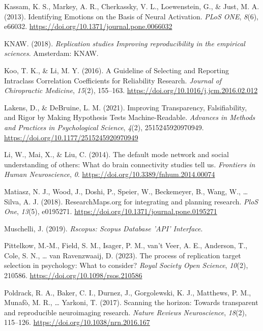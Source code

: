 \documentclass[
  man,floatsintext]{apa6}
\newlength{\cslhangindent}
\newlength{\cslentryspacingunit} %
\newenvironment{CSLReferences}[2] %
 {%
  \setlength{\parindent}{0pt}
  \ifodd #1
  \let\oldpar\par
  \def\par{\hangindent=\cslhangindent\oldpar}
  \fi
  \setlength{\parskip}{#2\cslentryspacingunit}
 }%
 {}
\begin{document}
\begin{CSLReferences}{1}{0}
\leavevmode{}%
Kassam, K. S., Markey, A. R., Cherkassky, V. L., Loewenstein, G., \& Just, M. A. (2013). Identifying {Emotions} on the {Basis} of {Neural Activation}. \emph{PLoS ONE}, \emph{8}(6), e66032. \url{https://doi.org/10.1371/journal.pone.0066032}

\leavevmode{}%
KNAW. (2018). \emph{Replication studies \textendash{} {Improving} reproducibility in the empirical sciences}. {Amsterdam}: {KNAW}.

\leavevmode{}%
Koo, T. K., \& Li, M. Y. (2016). A {Guideline} of {Selecting} and {Reporting Intraclass Correlation Coefficients} for {Reliability Research}. \emph{Journal of Chiropractic Medicine}, \emph{15}(2), 155--163. \url{https://doi.org/10.1016/j.jcm.2016.02.012}

\leavevmode{}%
Lakens, D., \& DeBruine, L. M. (2021). Improving {Transparency}, {Falsifiability}, and {Rigor} by {Making Hypothesis Tests Machine-Readable}. \emph{Advances in Methods and Practices in Psychological Science}, \emph{4}(2), 2515245920970949. \url{https://doi.org/10.1177/2515245920970949}

\leavevmode{}%
Li, W., Mai, X., \& Liu, C. (2014). The default mode network and social understanding of others: What do brain connectivity studies tell us. \emph{Frontiers in Human Neuroscience}, \emph{0}. \url{https://doi.org/10.3389/fnhum.2014.00074}

\leavevmode{}%
Matiasz, N. J., Wood, J., Doshi, P., Speier, W., Beckemeyer, B., Wang, W., \ldots{} Silva, A. J. (2018). {ResearchMaps}.org for integrating and planning research. \emph{PloS One}, \emph{13}(5), e0195271. \url{https://doi.org/10.1371/journal.pone.0195271}

\leavevmode{}%
Muschelli, J. (2019). \emph{Rscopus: {Scopus Database} '{API}' {Interface}}.

\leavevmode{}%
Pittelkow, M.-M., Field, S. M., Isager, P. M., van't Veer, A. E., Anderson, T., Cole, S. N., \ldots{} van Ravenzwaaij, D. (2023). The process of replication target selection in psychology: What to consider? \emph{Royal Society Open Science}, \emph{10}(2), 210586. \url{https://doi.org/10.1098/rsos.210586}

\leavevmode{}%
Poldrack, R. A., Baker, C. I., Durnez, J., Gorgolewski, K. J., Matthews, P. M., Munafò, M. R., \ldots{} Yarkoni, T. (2017). Scanning the horizon: Towards transparent and reproducible neuroimaging research. \emph{Nature Reviews Neuroscience}, \emph{18}(2), 115--126. \url{https://doi.org/10.1038/nrn.2016.167}


\end{CSLReferences}
\end{document}
